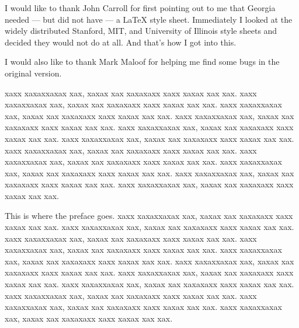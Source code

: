 \maketitle    %


I would like to thank John Carroll for first pointing out to me that 
Georgia needed --- but did not have --- a LaTeX style sheet.
Immediately I looked at the widely distributed Stanford, MIT, and
University of Illinois style sheets and decided they would not do at 
all. And that's how I got into this.

I would also like to thank Mark Maloof for helping me find some bugs in 
the original version.

xaxx xaxaxxaxax xax, xaxax xax xaxaxaxx xaxx xaxax xax xax.
xaxx xaxaxxaxax xax, xaxax xax xaxaxaxx xaxx xaxax xax xax.
xaxx xaxaxxaxax xax, xaxax xax xaxaxaxx xaxx xaxax xax xax.
xaxx xaxaxxaxax xax, xaxax xax xaxaxaxx xaxx xaxax xax xax.
xaxx xaxaxxaxax xax, xaxax xax xaxaxaxx xaxx xaxax xax xax.
xaxx xaxaxxaxax xax, xaxax xax xaxaxaxx xaxx xaxax xax xax.
xaxx xaxaxxaxax xax, xaxax xax xaxaxaxx xaxx xaxax xax xax.
xaxx xaxaxxaxax xax, xaxax xax xaxaxaxx xaxx xaxax xax xax.
xaxx xaxaxxaxax xax, xaxax xax xaxaxaxx xaxx xaxax xax xax.
xaxx xaxaxxaxax xax, xaxax xax xaxaxaxx xaxx xaxax xax xax.
xaxx xaxaxxaxax xax, xaxax xax xaxaxaxx xaxx xaxax xax xax.


This is where the preface goes.
xaxx xaxaxxaxax xax, xaxax xax xaxaxaxx xaxx xaxax xax xax.
xaxx xaxaxxaxax xax, xaxax xax xaxaxaxx xaxx xaxax xax xax.
xaxx xaxaxxaxax xax, xaxax xax xaxaxaxx xaxx xaxax xax xax.
xaxx xaxaxxaxax xax, xaxax xax xaxaxaxx xaxx xaxax xax xax.
xaxx xaxaxxaxax xax, xaxax xax xaxaxaxx xaxx xaxax xax xax.
xaxx xaxaxxaxax xax, xaxax xax xaxaxaxx xaxx xaxax xax xax.
xaxx xaxaxxaxax xax, xaxax xax xaxaxaxx xaxx xaxax xax xax.
xaxx xaxaxxaxax xax, xaxax xax xaxaxaxx xaxx xaxax xax xax.
xaxx xaxaxxaxax xax, xaxax xax xaxaxaxx xaxx xaxax xax xax.
xaxx xaxaxxaxax xax, xaxax xax xaxaxaxx xaxx xaxax xax xax.
xaxx xaxaxxaxax xax, xaxax xax xaxaxaxx xaxx xaxax xax xax.

\tableofcontents



\newpage
{}  %
        
